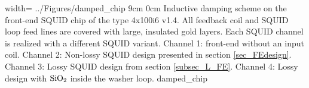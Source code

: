{width=\textwidth} %
{../Figures/damped_chip}
{9cm} %
{0cm}
{Inductive damping scheme on the front-end SQUID chip of the type 4x100i6 v1.4. All feedback coil and SQUID loop feed lines are covered with large, insulated gold layers. Each SQUID channel is realized with a different SQUID variant. Channel 1: front-end without an input coil. Channel 2: Non-lossy SQUID design presented in section \ref{sec_FEdesign}. Channel 3: Lossy SQUID design from section \ref{subsec_L_FE}. Channel 4: Lossy design with $\rm SiO_2$ inside the washer loop.}
{damped_chip}

